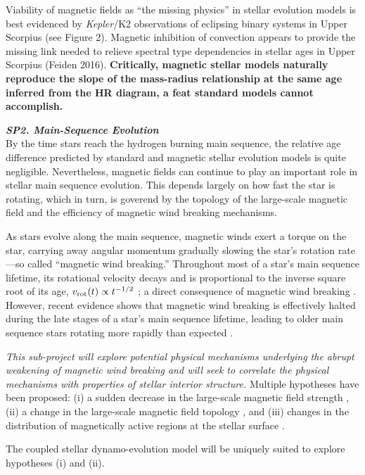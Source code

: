 \documentclass[12pt,a4paper]{article}
\begin{document}
Viability of magnetic fields as ``the missing physics'' in stellar evolution models is best evidenced by {\it Kepler}/K2 observations of eclipsing binary systems in Upper Scorpius (see Figure 2). Magnetic inhibition of convection appears to provide the missing link needed to relieve spectral type dependencies in stellar ages in Upper Scorpius (Feiden 2016). {\bf Critically, magnetic stellar models naturally reproduce the slope of the mass-radius relationship at the same age inferred from the HR diagram, a feat standard models cannot accomplish.}

\textbf{\textit{SP2. Main-Sequence Evolution}} \\
By the time stars reach the hydrogen burning main sequence, the relative age difference predicted by standard and magnetic stellar evolution models is quite negligible. Nevertheless, magnetic fields can continue to play an important role in stellar main sequence evolution. This depends largely on how fast the star is rotating, which in turn, is goverend by the topology of the large-scale magnetic field and the efficiency of magnetic wind breaking mechanisms. 

As stars evolve along the main sequence, magnetic winds exert a torque on the star, carrying away angular momentum gradually slowing the star's rotation rate---so called ``magnetic wind breaking.'' Throughout most of a star's main sequence lifetime, its rotational velocity decays and is proportional to the inverse square root of its age, $v_{\rm rot}(t) \propto t^{-1/2}$ \citep{Skumanich1972}; a direct consequence of magnetic wind breaking \citep{Durney1972}. However, recent evidence shows that magnetic wind breaking is effectively halted during the late stages of a star's main sequence lifetime, leading to older main sequence stars rotating more rapidly than expected \citep{vanSaders2016}. 

\emph{This sub-project will explore potential physical mechanisms underlying the abrupt weakening of magnetic wind breaking and will seek to correlate the physical mechanisms with properties of stellar interior structure.} Multiple hypotheses have been proposed: (i) a sudden decrease in the large-scale magnetic field strength \citep{Durney1977}, (ii) a change in the large-scale magnetic field topology \citep{Reville2015}, and (iii) changes in the distribution of magnetically active regions at the stellar surface \citep[][]{Cohen2009}. 

The coupled stellar dynamo-evolution model will be uniquely suited to explore hypotheses (i) and (ii). 
\end{document}
